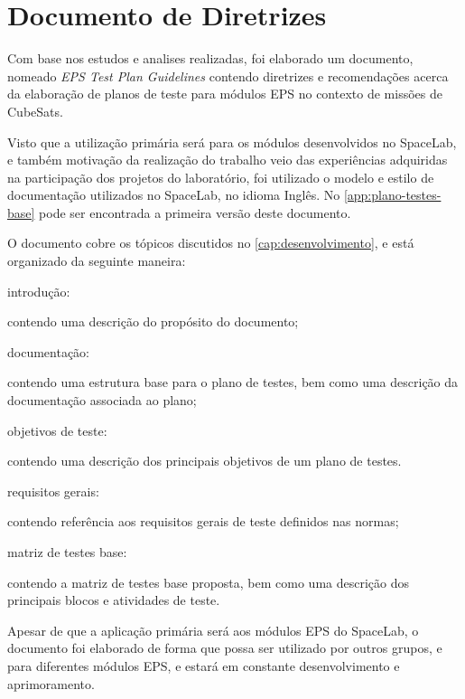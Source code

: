 \chapter{Documento de Diretrizes}

Com base nos estudos e analises realizadas, foi elaborado um documento, nomeado \textit{EPS Test Plan Guidelines} contendo diretrizes e recomendações acerca da elaboração de planos de teste para módulos \gls{EPS} no contexto de missões de CubeSats.

Visto que a utilização primária será para os módulos desenvolvidos no SpaceLab, e também motivação da realização do trabalho veio das experiências adquiridas na participação dos projetos do laboratório, foi utilizado o modelo e estilo de documentação utilizados no SpaceLab, no idioma Inglês.
No \autoref{app:plano-testes-base} pode ser encontrada a primeira versão deste documento.

O documento cobre os tópicos discutidos no \autoref{cap:desenvolvimento}, e está organizado da seguinte maneira:

\begin{alineas}
    \item introdução:
    \begin{alineas}
        \item contendo uma descrição do propósito do documento;
    \end{alineas}

    \item documentação:
    \begin{alineas}
        \item contendo uma estrutura base para o plano de testes, bem como uma descrição da documentação associada ao plano;
    \end{alineas}

    \item objetivos de teste:
    \begin{alineas}
        \item contendo uma descrição dos principais objetivos de um plano de testes.
    \end{alineas}

    \item requisitos gerais:
    \begin{alineas}
        \item contendo referência aos requisitos gerais de teste definidos nas normas;
    \end{alineas}

    \item matriz de testes base:
    \begin{alineas}
        \item contendo a matriz de testes base proposta, bem como uma descrição dos principais blocos e atividades de teste.
    \end{alineas}

\end{alineas}


Apesar de que a aplicação primária será aos módulos \gls{EPS} do SpaceLab, o documento foi elaborado de forma que possa ser utilizado por outros grupos, e para diferentes módulos \gls{EPS}, e estará em constante desenvolvimento e aprimoramento.